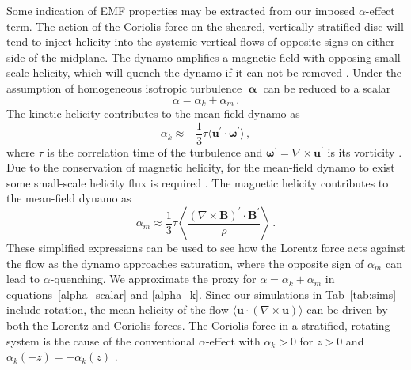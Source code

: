 \documentclass[fleqn,usenatbib]{mnras}
\newcommand\aver[1]{\langle#1\rangle}%
\renewcommand\vec[1]{\bm{#1}}%
\newcommand{\BB}{\vec{B}} %
\newcommand{\uu}{\vec{u}^\prime} %
\begin{document}
Some indication of EMF properties may be extracted from our imposed
$\alpha$-effect term. The action of the Coriolis force on the sheared,
vertically stratified disc will tend to inject helicity into the systemic
vertical flows of opposite signs on either side of the midplane. The dynamo
amplifies a magnetic field with opposing small-scale helicity, which will
quench the dynamo if it can not be removed \citep{Brandenburg_2005,SS21}. Under
the assumption of homogeneous isotropic turbulence $\vec{\upalpha}$ can be
reduced to a scalar
\begin{equation}
    \alpha = \alpha_k +\alpha_m\,.
    \label{alpha_scalar}
\end{equation}
The kinetic helicity contributes to the mean-field dynamo as
\begin{equation}
    \alpha_k \approx -\frac{1}{3}\tau \aver{\uu\cdot\vec{\omega}^\prime}\,,
    \label{alpha_k}
\end{equation}
where $\tau$ is the correlation time of the turbulence and $\vec{\omega}^\prime
= \nabla\times\uu$ is its vorticity \citep{Moffatt1978,1980mfmd_Krause_Radler}.
Due to the conservation of magnetic helicity, for the mean-field dynamo to
exist some small-scale helicity flux is required
\citep{PFL1976,Brandenburg_2005}. The magnetic helicity contributes to the
mean-field dynamo as
\begin{equation}
    \alpha_m \approx \frac{1}{3}\tau\left\langle\frac{(\nabla\times\BB)^\prime\cdot\BB^\prime}{\rho}\right\rangle\,.
    \label{alpha_m}
\end{equation}
These simplified expressions can be used to see how the Lorentz force acts
against the flow as the dynamo approaches saturation, where the opposite sign
of $\alpha_m$ can lead to $\alpha$-quenching. We approximate the proxy for
$\alpha = \alpha_k +\alpha_m$ in equations~\eqref{alpha_scalar} and
\eqref{alpha_k}. Since our simulations in Tab~\ref{tab:sims} include rotation,
the mean helicity of the flow $\langle
\vec{u}\cdot(\nabla\times\vec{u})\rangle$ can be driven by both the Lorentz and
Coriolis forces. The Coriolis force in a stratified, rotating system is the
cause of the conventional $\alpha$-effect with $\alpha_k>0$ for $z>0$ and
$\alpha_k(-z) = -\alpha_k(z)$ \citep[e.g., Section $7.1$ of][]{SS21}.
\end{document}
